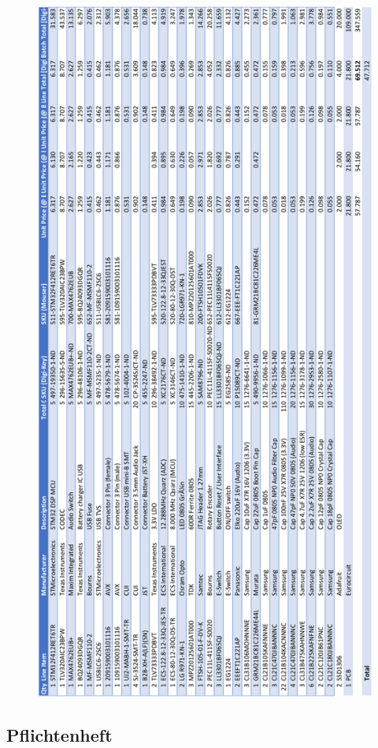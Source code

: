 \begin{appendix}
\begin{figure}[h]
	\centering
	\includegraphics[width=0.55\linewidth]{appendix/DSP-Board-BOM_5pcs.pdf}
\end{figure}
\clearpage

\subsection{Pflichtenheft}
\label{app:Pflichtenheft}


\end{appendix}
